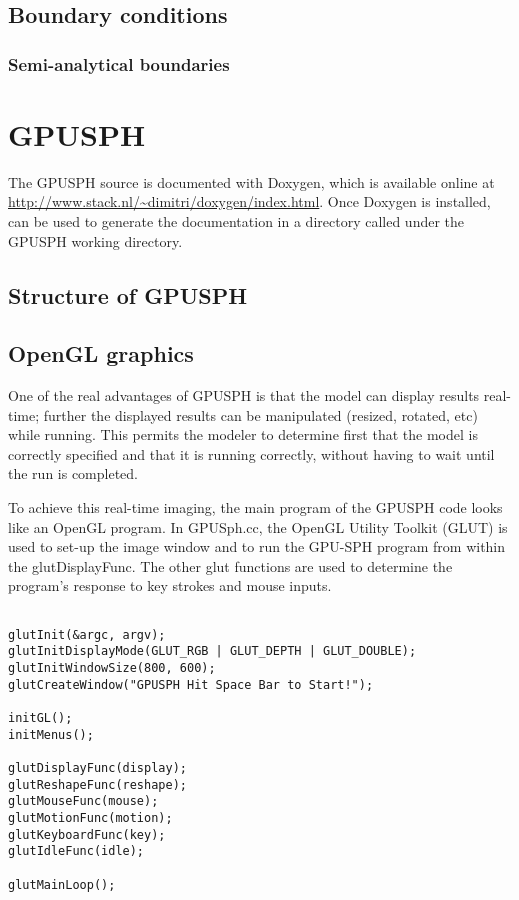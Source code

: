 \documentclass[12pt]{memoir}
\begin{document}
\section{Boundary conditions}

\subsection{Semi-analytical boundaries}




\chapter{GPUSPH}

The GPUSPH source is documented with Doxygen, which is available online
at \url{http://www.stack.nl/~dimitri/doxygen/index.html}. Once Doxygen
is installed,  can be used to generate the documentation
in a directory called  under the GPUSPH working directory.

\section{Structure of GPUSPH}


\iffalse

\section{OpenGL graphics}

One of the real advantages of GPUSPH is that the model can display
results real-time; further the displayed results can be manipulated
(resized, rotated, etc) while running. This permits the modeler to
determine first that the model is correctly specified and that it is
running correctly, without having to wait until the run is completed.

To achieve this real-time imaging, the main program of the GPUSPH code
looks like an OpenGL program. In GPUSph.cc, the OpenGL Utility Toolkit
(GLUT) is used to set-up the image window and to run the GPU-SPH program
from within the glutDisplayFunc. The other glut functions are used to
determine the program's response to key strokes and mouse inputs.

\begin{verbatim}

glutInit(&argc, argv);
glutInitDisplayMode(GLUT_RGB | GLUT_DEPTH | GLUT_DOUBLE);
glutInitWindowSize(800, 600);
glutCreateWindow("GPUSPH Hit Space Bar to Start!");

initGL();
initMenus();

glutDisplayFunc(display);
glutReshapeFunc(reshape);
glutMouseFunc(mouse);
glutMotionFunc(motion);
glutKeyboardFunc(key);
glutIdleFunc(idle);

glutMainLoop();
\end{verbatim}
\end{document}

